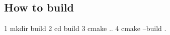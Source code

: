 \subsection*{How to build}


\begin{DoxyCode}
1 mkdir build
2 cd build
3 cmake ..
4 cmake --build .
\end{DoxyCode}
 